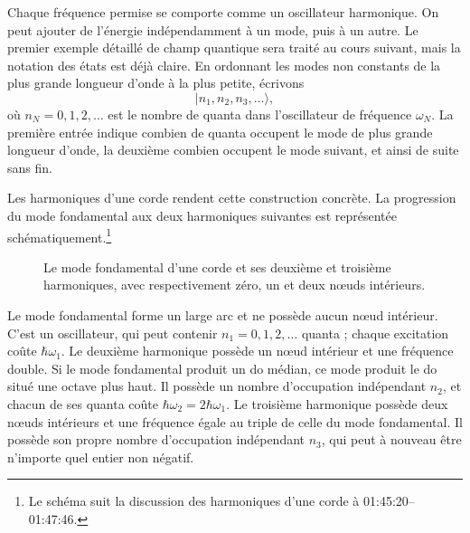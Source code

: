 Chaque fréquence permise se comporte comme un oscillateur harmonique. On peut ajouter de l’énergie indépendamment à un mode, puis à un autre. Le premier exemple détaillé de champ quantique sera traité au cours suivant, mais la notation des états est déjà claire. En ordonnant les modes non constants de la plus grande longueur d’onde à la plus petite, écrivons
\begin{equation}
|n_1,n_2,n_3,\ldots\rangle,
\end{equation}
où \(n_N=0,1,2,\ldots\) est le nombre de quanta dans l’oscillateur de fréquence \(\omega_N\). La première entrée indique combien de quanta occupent le mode de plus grande longueur d’onde, la deuxième combien occupent le mode suivant, et ainsi de suite sans fin.

Les harmoniques d’une corde rendent cette construction concrète. La progression du mode fondamental aux deux harmoniques suivantes est représentée schématiquement.\footnote{Le schéma suit la discussion des harmoniques d’une corde à 01:45:20--01:47:46.}

\begin{figure}[t]
\centering
{}
\caption{Le mode fondamental d’une corde et ses deuxième et troisième harmoniques, avec respectivement zéro, un et deux nœuds intérieurs.}
\end{figure}

Le mode fondamental forme un large arc et ne possède aucun nœud intérieur. C’est un oscillateur, qui peut contenir \(n_1=0,1,2,\ldots\) quanta ; chaque excitation coûte \(\hbar\omega_1\). Le deuxième harmonique possède un nœud intérieur et une fréquence double. Si le mode fondamental produit un do médian, ce mode produit le do situé une octave plus haut. Il possède un nombre d’occupation indépendant \(n_2\), et chacun de ses quanta coûte \(\hbar\omega_2=2\hbar\omega_1\). Le troisième harmonique possède deux nœuds intérieurs et une fréquence égale au triple de celle du mode fondamental. Il possède son propre nombre d’occupation indépendant \(n_3\), qui peut à nouveau être n’importe quel entier non négatif.

